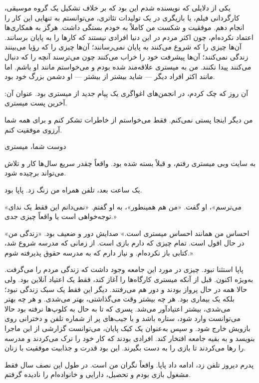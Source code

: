 
یکی از دلایلی که نویسنده شدم این بود که بر خلاف تشکیل یک گروه موسیقی، کارگردانی فیلم‌، یا بازیگری در یک تولیدات‌ تئاتری، می‌توانستم به تنهایی این کار را انجام دهم. موفقیت و شکست من کاملاً به خودم بستگی داشت. هرگز به همکاری‌ها اعتماد نکرده‌ام، چون اکثر مردم در این دنیا افرادی نیستند که کارها را به پایان برسانند. آن‌ها چیزی را که شروع می‌کنند به پایان نمی‌رسانند؛ آن‌ها چیزی را که رؤیا می‌بینند زندگی نمی‌کنند؛ آن‌ها پیشرفت خود را خراب می‌کنند چون می‌ترسند آنچه را که دنبال می‌کنند پیدا نکنند. من به میستری علاقه‌مند شده بودم و می‌خواستم مانند او باشم. اما مانند اکثر افراد دیگر --- شاید بیشتر از بیشتر --- او دشمن بزرگ خود بود.

آن روز که چک کردم، در انجمن‌های اغواگری یک پیام جدید از میستری بود. عنوان آن: آخرین پست میستری.

من دیگر اینجا پستی نمی‌کنم. فقط می‌خواستم از خاطرات تشکر کنم و برای همه شما آرزوی موفقیت کنم.

دوست شما، میستری

به سایت وبی میستری رفتم، و قبلاً بسته شده بود. واقعاً چقدر سریع سال‌ها کار و تلاش می‌تواند برچیده شود.

یک ساعت بعد، تلفن همراه من زنگ زد. پاپا بود.

«می‌ترسم»، او گفت. «من هم همینطور»، به او گفتم. «نمی‌دانم این فقط یک ندای توجه‌خواهی است یا واقعاً چیزی جدی.»

«احساس من همانند احساس میستری است.» صدایش دور و ضعیف بود. «زندگی من در حال افول است. تمام چیزی که دارم بازی است. از زمانی که مدرسه شروع شد، کتابی باز نکرده‌ام. و نیاز دارم که به مدرسه حقوق پذیرفته شوم.»

پاپا استثنا نبود. چیزی در مورد این جامعه وجود داشت که زندگی مردم را می‌گرفت. به‌ویژه اکنون. قبل از آنکه میستری کارگاه‌ها را آغاز کند، فقط یک اعتیاد آنلاین بود. ولی حالا همه در حال پرواز بودند و دور هم می‌رفتند. دیگر این فقط یک سبک زندگی نبود؛ بلکه یک بیماری بود. هر چه بیشتر وقت می‌گذاشتی، بهتر می‌شدی. و هر چه بهتر می‌شدی، بیشتر اعتیادآور می‌شد. پسری که تا به حال به کلوپ‌ها نرفته بود حالا می‌توانست وارد شود، ستاره باشد و با جیب‌های پر از شماره تلفن و دخترانی روی بازویش خارج شود. و سپس به‌عنوان یک کیک پایان، می‌توانست گزارشی از این ماجرا بنویسد و به بقیه جامعه افتخار کند. افرادی بودند که کار خود را ترک می‌کردند و مدرسه را رها می‌کردند تا بازی را به دست بگیرند. این بود قدرت و جذابیت موفقیت با زنان.

پدرم دیروز تلفن زد، ادامه داد پاپا. واقعاً نگران من است. در طول این نصف سال فقط مشغول بازی بودم و تحصیل، دارایی و خانواده‌ام را نادیده گرفتم.


